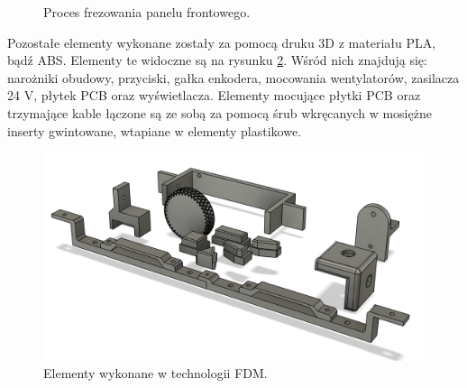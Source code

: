 \begin{figure}[h!]%
    \centering
    \qquad
    \caption{Proces frezowania panelu frontowego.}
    \label{fig:ugs}%
\end{figure}

Pozostałe elementy wykonane zostały za pomocą druku 3D z materiału PLA, bądź ABS. Elementy te widoczne są na rysunku 
\ref{fig:druk3d}. Wśród nich znajdują się: narożniki obudowy, przyciski, gałka enkodera, mocowania wentylatorów, zasilacza 
24 V, płytek PCB oraz wyświetlacza. Elementy mocujące płytki PCB oraz trzymające kable łączone są ze sobą za pomocą śrub 
wkręcanych w mosiężne inserty gwintowane, wtapiane w elementy plastikowe.

\begin{figure}[h!]
    \begin{center}
        \includegraphics[width = 15cm]{images/druk3d.png}
        \caption{Elementy wykonane w technologii FDM.} 
        \label{fig:druk3d}
    \end{center}
\end{figure}


